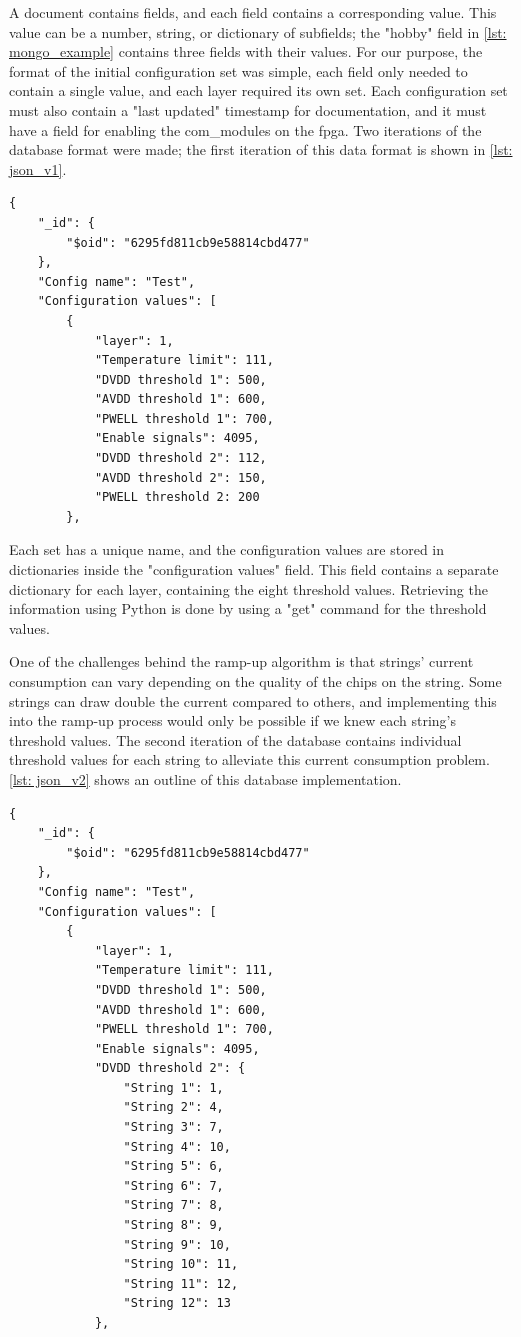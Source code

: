 \documentclass[main.tex]{subfiles}
\begin{document}
A document contains fields, and each field contains a corresponding value. This value can be a number, string, or dictionary of subfields; the "hobby" field in \autoref{lst: mongo_example} contains three fields with their values. For our purpose, the format of the initial configuration set was simple, each field only needed to contain a single value, and each layer required its own set. Each configuration set must also contain a "last updated" timestamp for documentation, and it must have a field for enabling the com\_modules on the \gls{fpga}. Two iterations of the database format were made; the first iteration of this data format is shown in \autoref{lst: json_v1}.

\begin{lstlisting}[caption={First iteration of JSON format of a configuration set.},captionpos=b, label=lst: json_v1]
{
	"_id": {
		"$oid": "6295fd811cb9e58814cbd477"
	},
	"Config name": "Test",
	"Configuration values": [
		{
			"layer": 1,
			"Temperature limit": 111,
			"DVDD threshold 1": 500,
			"AVDD threshold 1": 600,
			"PWELL threshold 1": 700,
			"Enable signals": 4095,
			"DVDD threshold 2": 112,
			"AVDD threshold 2": 150,
			"PWELL threshold 2: 200
		},
    \end{lstlisting}



Each set has a unique name, and the configuration values are stored in dictionaries inside the "configuration values" field. This field contains a separate dictionary for each layer, containing the eight threshold values. Retrieving the information using Python is done by using a "get" command for the threshold values.

One of the challenges behind the ramp-up algorithm is that strings' current consumption can vary depending on the quality of the chips on the string. Some strings can draw double the current compared to others, and implementing this into the ramp-up process would only be possible if we knew each string's threshold values. The second iteration of the database contains individual threshold values for each string to alleviate this current consumption problem. \autoref{lst: json_v2} shows an outline of this database implementation.

\begin{lstlisting}[caption={Second iteration of JSON format of a configuration set, with for individual strings.},captionpos=b, label=lst: json_v2]
{
	"_id": {
		"$oid": "6295fd811cb9e58814cbd477"
	},
	"Config name": "Test",
	"Configuration values": [
		{
			"layer": 1,
			"Temperature limit": 111,
			"DVDD threshold 1": 500,
			"AVDD threshold 1": 600,
			"PWELL threshold 1": 700,
			"Enable signals": 4095,
			"DVDD threshold 2": {
				"String 1": 1,
				"String 2": 4,
				"String 3": 7,
				"String 4": 10,
				"String 5": 6,
				"String 6": 7,
				"String 7": 8,
				"String 8": 9,
				"String 9": 10,
				"String 10": 11,
				"String 11": 12,
				"String 12": 13
			},
    \end{lstlisting}
\end{document}
